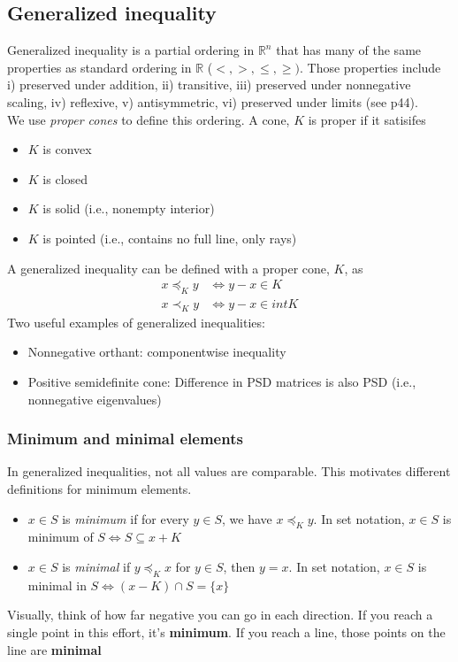 \documentclass{article}
\begin{document}
\subsection{Generalized inequality} %
Generalized inequality is a partial ordering in $\mathbb{R}^n$ that has many of the same properties as standard ordering in $\mathbb{R}$ ($<, >, \leq, \geq)$. Those properties include i) preserved under addition, ii) transitive, iii) preserved under nonnegative scaling, iv) reflexive, v) antisymmetric, vi) preserved under limits (see p44).\\
We use \textit{proper cones} to define this ordering. A cone, $K$ is proper if it satisifes
\begin{itemize}
  \item $K$ is convex
  \item $K$ is closed
  \item $K$ is solid (i.e., nonempty interior)
  \item $K$ is pointed (i.e., contains no full line, only rays)
\end{itemize}
A generalized inequality can be defined with a proper cone, $K$, as
\begin{align*}
  x \preceq_K y &\Longleftrightarrow y - x \in K\\
  x \prec_K y &\Longleftrightarrow y - x \in int K
\end{align*}
Two useful examples of generalized inequalities:
\begin{itemize}
  \item Nonnegative orthant: componentwise inequality
  \item Positive semidefinite cone: Difference in PSD matrices is also PSD (i.e., nonnegative eigenvalues)
\end{itemize}


\subsubsection{Minimum and minimal elements}
In generalized inequalities, not all values are comparable. This motivates different definitions for minimum elements.
\begin{itemize}
  \item $x \in S$ is \textit{minimum} if for every $y \in S$, we have $x \preceq_K y$. In set notation, $x \in S$ is minimum of $S \Longleftrightarrow S \subseteq x + K$
  \item $x \in S$ is \textit{minimal} if $y \preceq_K x$ for $y \in S$, then $y = x$. In set notation, $x \in S$ is minimal in $S \Longleftrightarrow (x - K) \cap S = \{x\}$
\end{itemize}
Visually, think of how far negative you can go in each direction. If you reach a single point in this effort, it's \textbf{minimum}. If you reach a line, those points on the line are \textbf{minimal}
\end{document}
